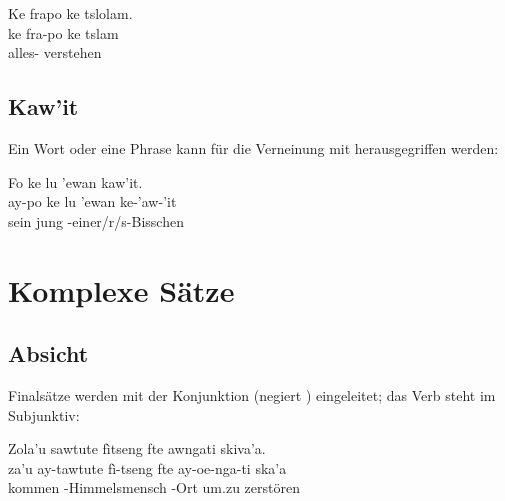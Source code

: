\begin{interlin}
	\glll \Npawl{}Ke frapo ke tslolam. \\
	ke fra-po ke tslam \\
	 alles-  verstehen \\
\end{interlin}

\subsection{Kaw'it} Ein Wort oder eine Phrase kann für die Verneinung mit   herausgegriffen werden:

\begin{interlin}
	\glll \Npawl{}Fo ke lu 'ewan kaw'it. \\
	ay-po ke lu 'ewan ke-'aw-'it \\
	  sein jung -einer/r/s-Bisschen \\
\end{interlin}

\section{Komplexe Sätze}


\subsection{Absicht} Finalsätze werden mit der Konjunktion  (negiert ) eingeleitet; das Verb steht im Subjunktiv:\label{syn:purpose}

\begin{interlin}
	\glll \Npawl{}Zola'u sawtute fìtseng fte awngati skiva'a. \\
	za'u ay-tawtute fì-tseng fte ay-oe-nga-ti ska'a \\
	kommen -Himmelsmensch -Ort um.zu  zerstören \\
\end{interlin}

